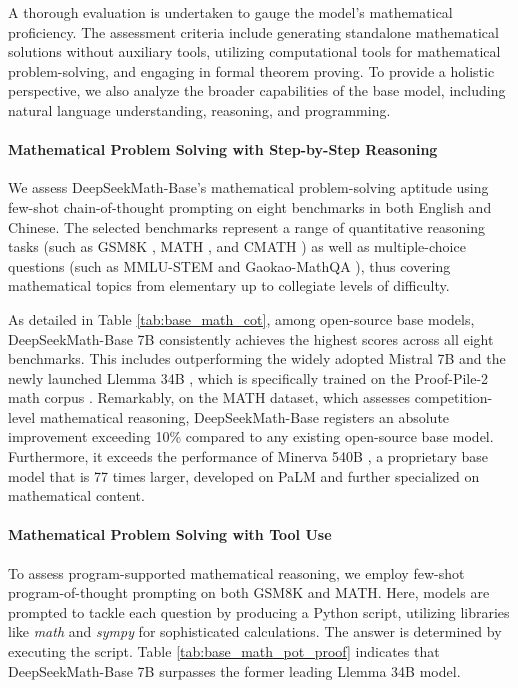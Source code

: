 A thorough evaluation is undertaken to gauge the model's mathematical proficiency. The assessment criteria include generating standalone mathematical solutions without auxiliary tools, utilizing computational tools for mathematical problem-solving, and engaging in formal theorem proving. To provide a holistic perspective, we also analyze the broader capabilities of the base model, including natural language understanding, reasoning, and programming.

\paragraph{Mathematical Problem Solving with Step-by-Step Reasoning}

We assess DeepSeekMath-Base's mathematical problem-solving aptitude using few-shot chain-of-thought prompting \citep{cot} on eight benchmarks in both English and Chinese. The selected benchmarks represent a range of quantitative reasoning tasks (such as GSM8K \citep{gsm8k}, MATH \citep{MATH}, and CMATH \citep{wei2023cmath}) as well as multiple-choice questions (such as MMLU-STEM \citep{mmlu} and Gaokao-MathQA \citep{agieval}), thus covering mathematical topics from elementary up to collegiate levels of difficulty.

As detailed in Table \ref{tab:base_math_cot}, among open-source base models, DeepSeekMath-Base 7B consistently achieves the highest scores across all eight benchmarks. This includes outperforming the widely adopted Mistral 7B \citep{mistral} and the newly launched Llemma 34B \citep{llemma}, which is specifically trained on the Proof-Pile-2 math corpus \citep{llemma}. Remarkably, on the MATH dataset, which assesses competition-level mathematical reasoning, DeepSeekMath-Base registers an absolute improvement exceeding 10\% compared to any existing open-source base model. Furthermore, it exceeds the performance of Minerva 540B \citep{minerva}, a proprietary base model that is 77 times larger, developed on PaLM \citep{palm} and further specialized on mathematical content.

\paragraph{Mathematical Problem Solving with Tool Use} To assess program-supported mathematical reasoning, we employ few-shot program-of-thought prompting \citep{pot,pal} on both GSM8K and MATH. Here, models are prompted to tackle each question by producing a Python script, utilizing libraries like \textit{math} and \textit{sympy} for sophisticated calculations. The answer is determined by executing the script. Table \ref{tab:base_math_pot_proof} indicates that DeepSeekMath-Base 7B surpasses the former leading Llemma 34B model.

